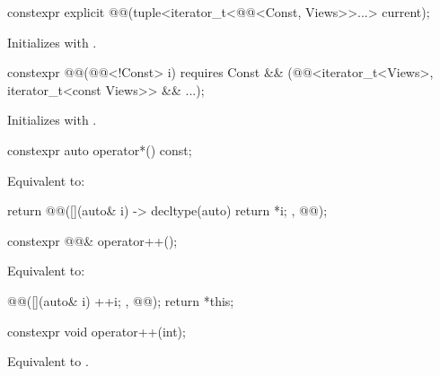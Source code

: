 \begin{itemdecl}
constexpr explicit @@(tuple<iterator_t<@@<Const, Views>>...> current);
\end{itemdecl}

\begin{itemdescr}
\pnum
\effects
Initializes  with .
\end{itemdescr}

\begin{itemdecl}
constexpr @@(@@<!Const> i)
  requires Const && (@@<iterator_t<Views>, iterator_t<const Views>> && ...);
\end{itemdecl}

\begin{itemdescr}
\pnum
\effects
Initializes  with .
\end{itemdescr}

\begin{itemdecl}
constexpr auto operator*() const;
\end{itemdecl}

\begin{itemdescr}
\pnum
\effects
Equivalent to:
\begin{codeblock}
return @@([](auto& i) -> decltype(auto) { return *i; }, @@);
\end{codeblock}
\end{itemdescr}

\begin{itemdecl}
constexpr @@& operator++();
\end{itemdecl}

\begin{itemdescr}
\pnum
\effects
Equivalent to:
\begin{codeblock}
@@([](auto& i) { ++i; }, @@);
return *this;
\end{codeblock}
\end{itemdescr}

\begin{itemdecl}
constexpr void operator++(int);
\end{itemdecl}

\begin{itemdescr}
\pnum
\effects
Equivalent to .
\end{itemdescr}

